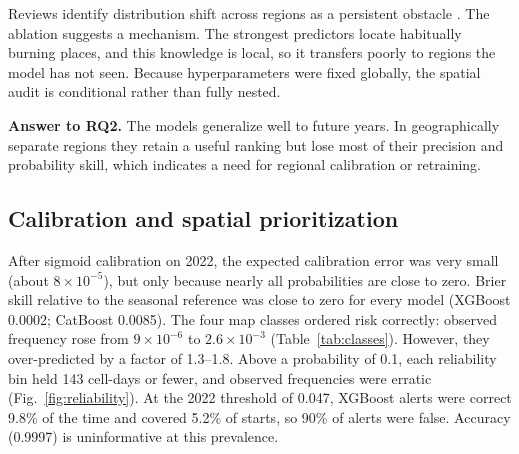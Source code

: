 \documentclass[pdflatex,sn-mathphys-num]{sn-jnl}
\begin{document}
Reviews identify distribution shift across regions as a persistent obstacle \cite{xu2025deep,ejaz2025pipeline,galvanlara2026systematic}. The ablation suggests a mechanism. The strongest predictors locate habitually burning places, and this knowledge is local, so it transfers poorly to regions the model has not seen. Because hyperparameters were fixed globally, the spatial audit is conditional rather than fully nested.

\textbf{Answer to RQ2.} The models generalize well to future years. In geographically separate regions they retain a useful ranking but lose most of their precision and probability skill, which indicates a need for regional calibration or retraining.

\subsection{Calibration and spatial prioritization}\label{sec:res_calibration}

After sigmoid calibration on 2022, the expected calibration error was very small (about $8\times10^{-5}$), but only because nearly all probabilities are close to zero. Brier skill relative to the seasonal reference was close to zero for every model (XGBoost 0.0002; CatBoost 0.0085). The four map classes ordered risk correctly: observed frequency rose from $9\times10^{-6}$ to $2.6\times10^{-3}$ (Table~\ref{tab:classes}). However, they over-predicted by a factor of 1.3--1.8. Above a probability of 0.1, each reliability bin held 143 cell-days or fewer, and observed frequencies were erratic (Fig.~\ref{fig:reliability}). At the 2022 threshold of 0.047, XGBoost alerts were correct 9.8\% of the time and covered 5.2\% of starts, so 90\% of alerts were false. Accuracy (0.9997) is uninformative at this prevalence.
\end{document}
